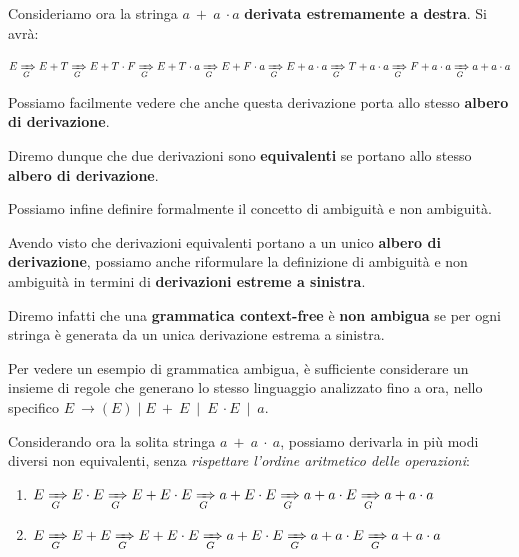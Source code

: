 Consideriamo ora la stringa $a\ +\ a\ \cdot a$ \textbf{derivata estremamente a destra}. Si avrà:

\begin{equation}
    E \xRightarrow[G]{} E + T \xRightarrow[G]{} E + T \cdot F \xRightarrow[G]{} E + T \cdot a \xRightarrow[G]{} E + F \cdot a \xRightarrow[G]{} E + a \cdot a \xRightarrow[G]{} T + a \cdot a \xRightarrow[G]{} F + a \cdot a \xRightarrow[G]{} a + a \cdot a
\end{equation}

Possiamo facilmente vedere che anche questa derivazione porta allo stesso \textbf{albero di derivazione}.

Diremo dunque che due derivazioni sono \textbf{equivalenti} se portano allo stesso \textbf{albero di derivazione}.

Possiamo infine definire formalmente il concetto di ambiguità e non ambiguità.


Avendo visto che derivazioni equivalenti portano a un unico \textbf{albero di derivazione}, possiamo anche riformulare la definizione di ambiguità e non ambiguità in termini di \textbf{derivazioni estreme a sinistra}.

Diremo infatti che una \textbf{grammatica context-free} è \textbf{non ambigua} se per ogni stringa è generata da un unica derivazione estrema a sinistra.

Per vedere un esempio di grammatica ambigua, è sufficiente considerare un insieme di regole che generano lo stesso linguaggio analizzato fino a ora, nello specifico $E\ \to (E) \mid E\ +\ E\ \mid\ E\ \cdot E\ \mid\ a$.

Considerando ora la solita stringa $a\ +\ a\ \cdot\ a$, possiamo derivarla in più modi diversi non equivalenti, senza \textit{rispettare l'ordine aritmetico delle operazioni}:

\begin{enumerate}
  \item $E \xRightarrow[G]{} E \cdot E \xRightarrow[G]{} E + E \cdot E \xRightarrow[G]{} a + E \cdot E \xRightarrow[G]{} a + a \cdot E \xRightarrow[G]{} a + a \cdot a $
  \item $E \xRightarrow[G]{} E + E \xRightarrow[G]{} E + E \cdot E \xRightarrow[G]{} a + E \cdot E \xRightarrow[G]{} a + a \cdot E \xRightarrow[G]{} a + a \cdot a $
\end{enumerate}

